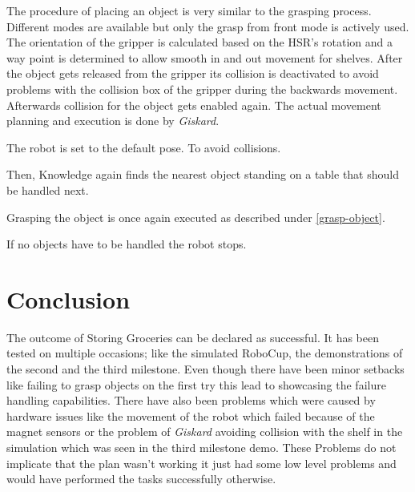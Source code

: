 \documentclass[main.tex]{subfiles}
\begin{document}
	The procedure of placing an object is very similar to the grasping process. Different modes are available but only the grasp from front mode is actively used. The orientation of the gripper is calculated based on the HSR's rotation and a way point is determined to allow smooth in and  out movement for shelves. After the object gets released from the gripper its collision is deactivated to avoid problems with the collision box of the gripper during the backwards movement. Afterwards collision for the object gets enabled again. The actual movement planning and execution is done by \textit{Giskard}.   	
	
	
	The robot is set to the default pose. To avoid collisions.
	
	
	Then, Knowledge again finds the nearest object standing on a table that should be handled next.
	
	
	Grasping the object is once again executed as described under \ref{grasp-object}.
	
	If no objects have to be handled the robot stops.
	
	
	\section{Conclusion}

	The outcome of Storing Groceries can be declared as successful. It has been tested on multiple occasions; like the simulated RoboCup, the demonstrations of the second and the third milestone. 
	Even though there have been minor setbacks like failing to grasp objects on the first try this lead to showcasing the failure handling capabilities.
	There have also been problems which were caused by hardware issues like the movement of the robot which failed because of the magnet sensors or the problem of \textit{Giskard} avoiding collision with the shelf in the simulation which was seen in the third milestone demo.
	These Problems do not implicate that the plan wasn't working it just had some low level problems and would have performed the tasks successfully otherwise.
	
	
	\endgroup
	
\end{document}

